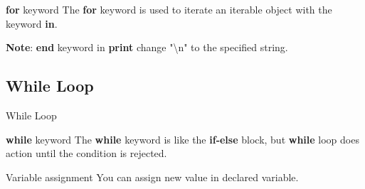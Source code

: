 \documentclass[aspectratio=43]{beamer}
\begin{document}
\begin{frame}
    \begin{block}{\textbf{for} keyword}
        The \textbf{for} keyword is used to iterate an iterable object with the keyword \textbf{in}.
    \end{block}
    \begin{example}
        
        \textbf{Note}: \textbf{end} keyword in \textbf{print} change "\textbackslash n" to the specified string.
    \end{example}
\end{frame}

\subsection{While Loop}
\begin{frame}{While Loop}
    \begin{block}{\textbf{while} keyword}
        The \textbf{while} keyword is like the \textbf{if-else} block, but \textbf{while} loop does action until the condition is rejected.
    \end{block}
    \begin{block}{Variable assignment}
        You can assign new value in declared variable.
        
    \end{block}
\end{frame}

\begin{frame}
    \begin{example}
        
    \end{example}
\end{frame}
\end{document}
